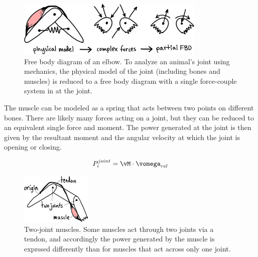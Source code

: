 %
\begin{figure}[h]		%
\begin{centering}
\includegraphics[width=0.8\textwidth]{Figures/ElbowFBD}\par
\end{centering}
\caption[Diagram: Free Body Diagram of an Elbow]{Free body diagram of an elbow. To analyze an animal's joint using mechanics, the physical model of the joint (including bones and muscles) is reduced to a free body diagram with a single force-couple system in at the joint.}
\label{fig:ElbowFBD}
\end{figure}
%

The muscle can be modeled as a spring that acts between two points on different bones. There are likely many forces acting on a joint, but they can be reduced to an equivalent single force and moment. The power generated at the joint is then given by the resultant moment and the angular velocity at which the joint is opening or closing.

\begin{equation}
P_{i}^{joint} = \vM \cdot \vomega_{rel}
\end{equation}

\begin{figure}[h]		%
\begin{centering}
\includegraphics[width=0.3\textwidth]{Figures/TwoJoints}\par
\end{centering}
\caption[Diagram: Two-Joint Muscles]{Two-joint muscles. Some muscles act through two joints via a tendon, and accordingly the power generated by the muscle is exprssed differently than for muscles that act across only one joint.}
\label{fig:TwoJoints}
\end{figure}
%

